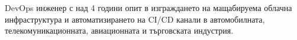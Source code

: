 \small
DevOps инженер с над 4 години опит в изграждането на мащабируема облачна инфраструктура и автоматизирането на CI/CD канали в автомобилната, телекомуникационната, авиационната и търговската индустрия.
